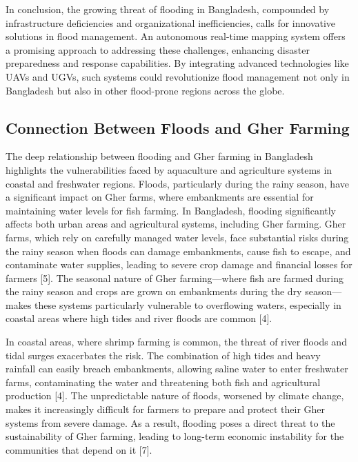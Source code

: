 \documentclass[conference]{IEEEtran}
\begin{document}
In conclusion, the growing threat of flooding in Bangladesh, compounded by infrastructure deficiencies and organizational inefficiencies, calls for innovative solutions in flood management. An autonomous real-time mapping system offers a promising approach to addressing these challenges, enhancing disaster preparedness and response capabilities. By integrating advanced technologies like UAVs and UGVs, such systems could revolutionize flood management not only in Bangladesh but also in other flood-prone regions across the globe.

\subsection{\textbf{Connection Between Floods and Gher Farming}}
The deep relationship between flooding and Gher farming in Bangladesh highlights the vulnerabilities faced by aquaculture and agriculture systems in coastal and freshwater regions. Floods, particularly during the rainy season, have a significant impact on Gher farms, where embankments are essential for maintaining water levels for fish farming. In Bangladesh, flooding significantly affects both urban areas and agricultural systems, including Gher farming. Gher farms, which rely on carefully managed water levels, face substantial risks during the rainy season when floods can damage embankments, cause fish to escape, and contaminate water supplies, leading to severe crop damage and financial losses for farmers [5]. The seasonal nature of Gher farming—where fish are farmed during the rainy season and crops are grown on embankments during the dry season—makes these systems particularly vulnerable to overflowing waters, especially in coastal areas where high tides and river floods are common [4].

In coastal areas, where shrimp farming is common, the threat of river floods and tidal surges exacerbates the risk. The combination of high tides and heavy rainfall can easily breach embankments, allowing saline water to enter freshwater farms, contaminating the water and threatening both fish and agricultural production [4]. The unpredictable nature of floods, worsened by climate change, makes it increasingly difficult for farmers to prepare and protect their Gher systems from severe damage. As a result, flooding poses a direct threat to the sustainability of Gher farming, leading to long-term economic instability for the communities that depend on it [7].
\end{document}

